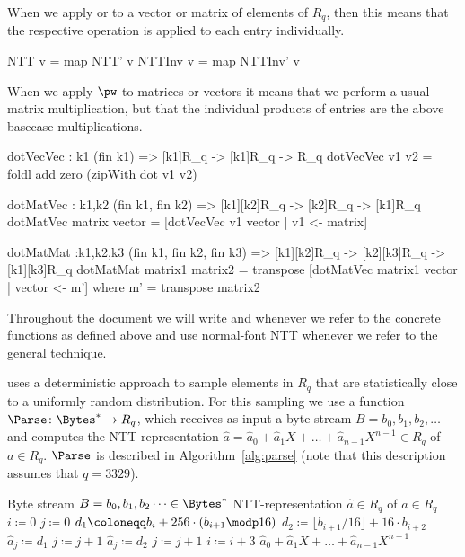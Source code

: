 When we apply \NTT or \INVNTT to a vector or matrix of elements of $R_q$,
then this means that the respective operation is applied to each entry
individually.

\begin{code}
  NTT v = map NTT' v
  NTTInv v = map NTTInv' v
\end{code}

When we apply $\pw$ to matrices or vectors it means that 
we perform a usual matrix multiplication, but that the individual products
of entries are the above basecase multiplications.

\begin{code}
  dotVecVec : {k1} (fin k1) => [k1]R_q -> [k1]R_q -> R_q
  dotVecVec v1 v2 = foldl add zero (zipWith dot v1 v2)
  
  dotMatVec : {k1,k2} (fin k1, fin k2) => [k1][k2]R_q -> [k2]R_q -> [k1]R_q
  dotMatVec matrix vector = [dotVecVec v1 vector | v1 <- matrix]
  
  dotMatMat :{k1,k2,k3} (fin k1, fin k2, fin k3) =>
    [k1][k2]R_q -> [k2][k3]R_q -> [k1][k3]R_q
  dotMatMat matrix1 matrix2 = transpose [dotMatVec matrix1 vector | vector <- m']
      where m' = transpose matrix2
\end{code}

Throughout the document we will write \NTT and \INVNTT whenever we refer
to the concrete functions as defined above and use normal-font NTT
whenever we refer to the general technique.

\Kyber uses a deterministic approach to sample elements in $R_q$
that are statistically close to a uniformly random distribution.
For this sampling we use a function $\Parse\colon\Bytes^* \rightarrow R_q$, 
which receives as input a byte stream $B = b_0, b_1, b_2, \dots$ and
computes the NTT-representation $\hat{a} = \hat{a}_0 + \hat{a}_1 X + \dots + \hat{a}_{n-1}X^{n-1} \in R_q$ of $a \in R_q$. $\Parse$ is described in Algorithm~\ref{alg:parse} (note that this description assumes that $q=3329$).

\begin{algorithm}
  \caption{$\Parse\colon\Bytes^* \rightarrow R_q^n$}
  \label{alg:parse}
\begin{algorithmic}
  \Require Byte stream $B = b_0, b_1, b_2 \dots \in \Bytes^*$ 
  \Ensure NTT-representation $\hat{a} \in R_q$ of $a \in R_q$
  \State $i \coloneqq 0$
  \State $j \coloneqq 0$
    \State $d_1 \coloneqq b_i + 256\cdot (b_{i+1}\modp 16)$
    \State $d_2 \coloneqq \lfloor b_{i+1}/16\rfloor + 16\cdot b_{i+2}$
      \State $\hat{a}_j \coloneqq d_1$\label{line:parse:bitrev1}
      \State $j \coloneqq j+1$
    \EndIf
      \State $\hat{a}_j \coloneqq d_2$\label{line:parse:bitrev2}
      \State $j \coloneqq j+1$
    \EndIf
    \State $i \coloneqq i+3$
  \EndWhile
  \State \Return $\hat{a}_0 + \hat{a}_1 X + \dots + \hat{a}_{n-1}X^{n-1}$
\end{algorithmic}
\end{algorithm}

